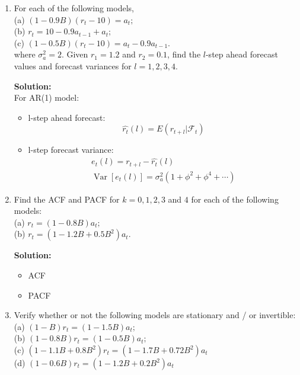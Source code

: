 \documentclass{article}
\begin{document}
\begin{enumerate}
	\item For each of the following models,\\
	(a) $(1-0.9 B)\left(r_{t}-10\right)=a_{t};$\\
	(b) $r_{t}=10-0.9 a_{t-1}+a_{t};$\\
	(c) $(1-0.5 B)\left(r_{t}-10\right)=a_{t}-0.9 a_{t-1}.$\\
	where $\sigma_a^2 = 2$. Given $r_1 = 1.2$ and $r_2 = 0.1$, find the $l$-step ahead forecast values and forecast variances for $l = 1,2,3,4$.
	
	\textbf{Solution:}\\
	For AR(1) model:
	\begin{itemize}
		\item l-step ahead forecast:
		\begin{equation*}
		\hat{r_t}(l) = E(r_{t+l} | \mathcal{F}_t)
		\end{equation*}
		
		\item l-step forecast variance:
		\begin{equation*}
		\begin{array}{c}
		e_t(l) = r_{t+l} - \hat{r_t}(l)\\
		\operatorname{Var}\left[e_t(l)\right] = \sigma_a^2 \left(1+\phi^2+\phi^4+\cdots\right)
		\end{array}
		\end{equation*}
	\end{itemize}

	\item Find the ACF and PACF for $k = 0, 1, 2, 3$ and $4$ for each of the following models:\\
	(a) $r_{t}=(1-0.8 B) a_{t};$\\
	(b) $r_{t}=\left(1-1.2 B+0.5 B^{2}\right) a_{t}.$
	
	\textbf{Solution:}
	\begin{itemize}
		\item ACF
		\item PACF
	\end{itemize}
	
	\item Verify whether or not the following models are stationary and / or invertible:\\
	(a) $(1-B) r_{t}=(1-1.5 B) a_{t};$\\
	(b) $(1-0.8 B) r_{t}=(1-0.5 B) a_{t};$\\
	(c) $\left(1-1.1 B+0.8 B^{2}\right) r_{t}=\left(1-1.7 B+0.72 B^{2}\right) a_{t}$\\
	(d) $(1-0.6 B) r_{t} =\left(1-1.2 B+0.2 B^{2}\right) a_{t}$
	

\end{enumerate}
\end{document}
